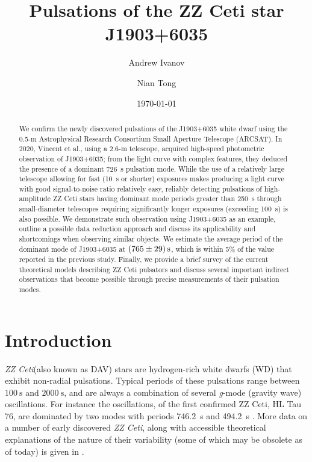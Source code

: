 \documentclass{aastex631}
\begin{document}
\author{Andrew Ivanov}
\author{Nian Tong}
\date{\today}
\title{Pulsations of the ZZ Ceti star J1903+6035}

\begin{abstract}
We confirm the newly discovered pulsations of the J1903+6035 white
dwarf using the 0.5-m Astrophysical Research Consortium Small Aperture
Telescope (ARCSAT).  In 2020, Vincent et al., using a 2.6-m telescope,
acquired high-speed photometric observation of J1903+6035; from the
light curve with complex features, they deduced the presence of a
dominant \SI{726}{\second} pulsation mode. While the use of a
relatively large telescope allowing for fast (\SI{10}{\second} or
shorter) exposures makes producing a light curve with good
signal-to-noise ratio relatively easy, reliably detecting pulsations
of high-amplitude ZZ Ceti stars having dominant mode periods greater
than \SI{250}{\second} through small-diameter telescopes requiring
significantly longer exposures (exceeding \SI{100}{\second}) is also
possible. We demonstrate such observation using J1903+6035 as an
example, outline a possible data reduction approach and discuss its
applicability and shortcomings when observing similar objects. We
estimate the average period of the dominant mode of J1903+6035 at
$\SI{765\pm 29}{\second}$, which is within 5\% of the value reported
in the previous study. Finally, we provide a brief survey of the
current theoretical models describing ZZ Ceti pulsators and discuss
several important indirect observations that become possible through
precise measurements of their pulsation modes.
\end{abstract}
\section{Introduction}
\emph{ZZ Ceti}(also known as DAV) stars are hydrogen-rich white dwarfs
(WD) that exhibit non-radial pulsations. Typical periods of these
pulsations range between \(\SI{100}{\second}\) and
\(\SI{2000}{\second}\), and are always a combination of several
\emph{g}-mode (gravity wave) oscillations. For instance the
oscillations, of the first confirmed ZZ Ceti, HL Tau 76, are dominated
by two modes with periods \SI{746.2}{\second} and \SI{494.2}{\second}
\citep{Koester_1990}. More data on a number of early discovered
\emph{ZZ Ceti}, along with accessible theoretical explanations of the
nature of their variability (some of which may be obsolete as of
today) is given in \citet{Bradley_1998}.
\end{document}
